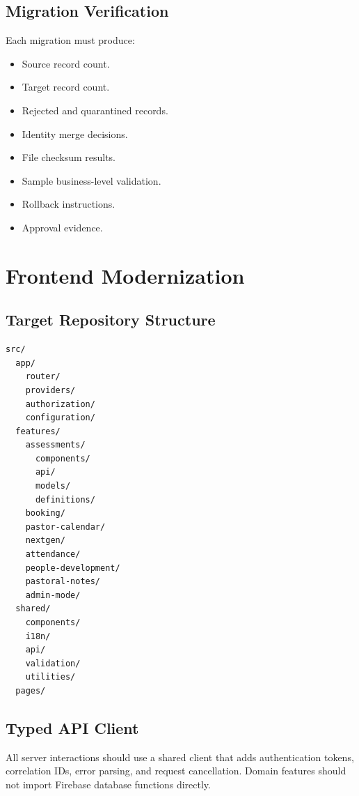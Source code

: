 \documentclass[11pt,a4paper,oneside]{report}
\begin{document}
\section{Migration Verification}

Each migration must produce:

\begin{itemize}
  \item Source record count.
  \item Target record count.
  \item Rejected and quarantined records.
  \item Identity merge decisions.
  \item File checksum results.
  \item Sample business-level validation.
  \item Rollback instructions.
  \item Approval evidence.
\end{itemize}

\chapter{Frontend Modernization}

\section{Target Repository Structure}

\begin{lstlisting}[caption={Recommended frontend organization}]
src/
  app/
    router/
    providers/
    authorization/
    configuration/
  features/
    assessments/
      components/
      api/
      models/
      definitions/
    booking/
    pastor-calendar/
    nextgen/
    attendance/
    people-development/
    pastoral-notes/
    admin-mode/
  shared/
    components/
    i18n/
    api/
    validation/
    utilities/
  pages/
\end{lstlisting}

\section{Typed API Client}

All server interactions should use a shared client that adds authentication tokens, correlation IDs, error parsing, and request cancellation. Domain features should not import Firebase database functions directly.
\end{document}
